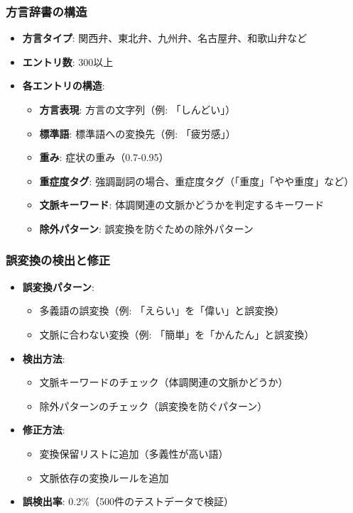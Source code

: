 \documentclass[a4paper,11pt,ja=standard,xelatex]{bxjsarticle}
\theoremstyle{definition}
\begin{document}
\subsubsection{方言辞書の構造}

\begin{itemize}
\item \textbf{方言タイプ}: 関西弁、東北弁、九州弁、名古屋弁、和歌山弁など
\item \textbf{エントリ数}: 300以上
\item \textbf{各エントリの構造}:
  \begin{itemize}
  \item \textbf{方言表現}: 方言の文字列（例: 「しんどい」）
  \item \textbf{標準語}: 標準語への変換先（例: 「疲労感」）
  \item \textbf{重み}: 症状の重み（0.7-0.95）
  \item \textbf{重症度タグ}: 強調副詞の場合、重症度タグ（「重度」「やや重度」など）
  \item \textbf{文脈キーワード}: 体調関連の文脈かどうかを判定するキーワード
  \item \textbf{除外パターン}: 誤変換を防ぐための除外パターン
  \end{itemize}
\end{itemize}

\subsubsection{誤変換の検出と修正}

\begin{itemize}
\item \textbf{誤変換パターン}: 
  \begin{itemize}
  \item 多義語の誤変換（例: 「えらい」を「偉い」と誤変換）
  \item 文脈に合わない変換（例: 「簡単」を「かんたん」と誤変換）
  \end{itemize}
\item \textbf{検出方法}: 
  \begin{itemize}
  \item 文脈キーワードのチェック（体調関連の文脈かどうか）
  \item 除外パターンのチェック（誤変換を防ぐパターン）
  \end{itemize}
\item \textbf{修正方法}: 
  \begin{itemize}
  \item 変換保留リストに追加（多義性が高い語）
  \item 文脈依存の変換ルールを追加
  \end{itemize}
\item \textbf{誤検出率}: 0.2\%（500件のテストデータで検証）
\end{itemize}
\end{document}
